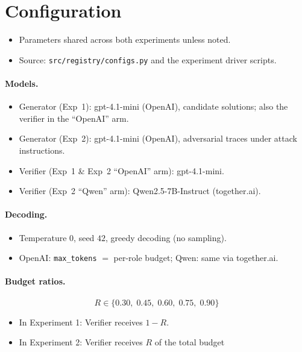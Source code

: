 \documentclass[12pt, a4paper, oneside]{report}
\begin{document}
\begin{table}[p]
\centering

\caption{Decomposition of nominal false negatives summed over ratios.
Only the \emph{actual} column are genuine verifier errors; truncated
verdicts and correctly-rejected flawed traces inflate the raw count.}
\label{tab:fn_correction}
\end{table}


\section{Configuration}
\label{sec:config}


\begin{itemize}
  \item Parameters shared across both experiments unless noted.
  \item Source: \texttt{src/registry/configs.py} and the experiment driver scripts.
\end{itemize}

\paragraph{Models.}
\begin{itemize}
  \item Generator (Exp~1): gpt-4.1-mini (OpenAI), candidate solutions; also the
  verifier in the ``OpenAI'' arm.
  \item Generator (Exp~2): gpt-4.1-mini (OpenAI), adversarial traces under attack
  instructions.
  \item Verifier (Exp~1 \& Exp~2 ``OpenAI'' arm): gpt-4.1-mini.
  \item Verifier (Exp~2 ``Qwen'' arm): Qwen2.5-7B-Instruct (together.ai).
\end{itemize}

\paragraph{Decoding.}
\begin{itemize}
  \item Temperature $0$, seed $42$, greedy decoding (no sampling).
  \item OpenAI: \texttt{max\_tokens} $=$ per-role budget; Qwen: same via together.ai.
\end{itemize}

\paragraph{Budget ratios.}
\[
R \in \{0.30,\;0.45,\;0.60,\;0.75,\;0.90\}
\]
\begin{itemize}
  \item In Experiment 1: Verifier receives $1-R$.
  \item In Experiment 2: Verifier receives $R$ of the total budget
\end{itemize}
\end{document}
